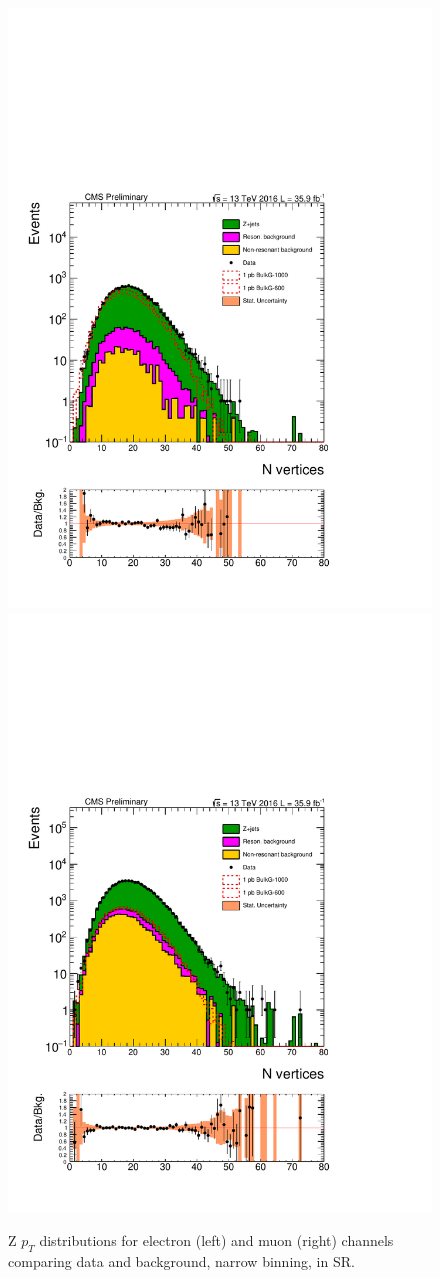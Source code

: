 \begin{figure}[htbp!]
\centering
\includegraphics[width=0.46\linewidth,page=10]{figures/ReMiniSummer16_DT_PhReMiniMCRcFixXsec_GMCPhPtWt_SRdPhiGT0p5_puWeightsummer16_muoneg_gjet_metfilter_unblind_el_log_1pb.pdf}
\includegraphics[width=0.46\linewidth,page=10]{figures/ReMiniSummer16_DT_PhReMiniMCRcFixXsec_GMCPhPtWt_SRdPhiGT0p5_puWeightsummer16_muoneg_gjet_metfilter_unblind_mu_log_1pb.pdf}
\caption{Z $p_T$ distributions for electron (left) and muon (right) channels
comparing data and background, 
narrow binning, in SR.}
\label{fit:SR_gjet_zpt_narrow}
\end{figure}

